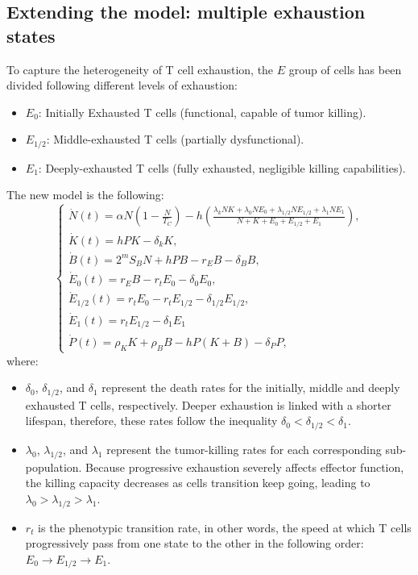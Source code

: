 \documentclass[12pt,a4paper]{article}
\begin{document}
\subsection{Extending the model: multiple exhaustion states}
To capture the heterogeneity of T cell exhaustion, the $E$ group of cells has been divided following different levels of exhaustion:
\begin{itemize}
    \item $E_0$: Initially Exhausted T cells (functional, capable of tumor killing).
    \item $E_{1/2}$: Middle-exhausted T cells (partially dysfunctional).
    \item $E_1$: Deeply-exhausted T cells (fully exhausted, negligible killing capabilities).
\end{itemize}
The new model is the following:
\begin{equation}
\begin{cases}
    \dot{N}(t) = \alpha N \left(1 - \frac{N}{T_C}\right) - h \left( \frac{\lambda_k N K + \lambda_0 N E_0 + \lambda_{1/2} N E_{1/2} + \lambda_1 N E_1}{N + K + E_0 + E_{1/2} + E_1} \right), \\[2ex]
    \dot{K}(t) = h P K - \delta_k K, \\[2ex]
    \dot{B}(t) = 2^m S_B N + h P B - r_E B - \delta_B B, \\[2ex]
    \dot{E}_0(t) = r_E B - r_t E_0 - \delta_0 E_0, \\[2ex]
    \dot{E}_{1/2}(t) = r_t E_0 - r_t E_{1/2} - \delta_{1/2} E_{1/2}, \\[2ex]
    \dot{E}_1(t) = r_t E_{1/2} - \delta_1 E_1\\[2ex]
    \dot{P}(t) = \rho_K K + \rho_B B - h P (K + B) - \delta_P P,
\end{cases}
\end{equation}
where:
\begin{itemize}
    \item $\delta_0$, $\delta_{1/2}$, and $\delta_1$ represent the death rates for the initially, middle and deeply exhausted T cells, respectively. Deeper exhaustion is linked with a shorter lifespan, therefore, these rates follow the inequality $\delta_0 < \delta_{1/2} < \delta_1$.
    
    \item $\lambda_0$, $\lambda_{1/2}$, and $\lambda_1$ represent the tumor-killing rates for each corresponding sub-population. Because progressive exhaustion severely affects effector function, the killing capacity decreases as cells transition keep going, leading to $\lambda_0 > \lambda_{1/2} > \lambda_1$.
    
    \item $r_t$ is the phenotypic transition rate, in other words, the speed at which T cells progressively pass from one state to the other in the following order: $E_0 \rightarrow E_{1/2} \rightarrow E_1$.
\end{itemize}
\end{document}
